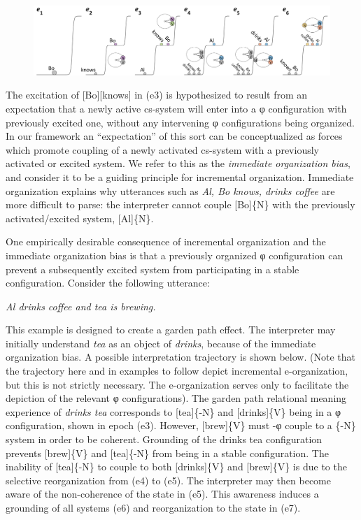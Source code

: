   
\begin{figure}
\includegraphics[width=\textwidth]{figures/Tilsen-img129.png}
\caption{\missingcaption}
\label{fig:}
\end{figure}
 

  The excitation of [Bo][knows] in (e3) is hypothesized to result from an expectation that a newly active cs-system will enter into a φ configuration with previously excited one, without any intervening φ configurations being organized. In our framework an “expectation” of this sort can be conceptualized as forces which promote coupling of a newly activated cs-system with a previously activated or excited system. We refer to this as the \textit{immediate organization bias}, and consider it to be a guiding principle for incremental organization. Immediate organization explains why utterances such as \textit{Al, Bo knows, drinks coffee} are more difficult to parse: the interpreter cannot couple [Bo]\{N\} with the previously activated/excited system, [Al]\{N\}.

  One empirically desirable consequence of incremental organization and the immediate organization bias is that a previously organized φ configuration can prevent a subsequently excited system from participating in a stable configuration. Consider the following utterance: 

    \textit{Al drinks coffee and tea is brewing.}   

  This example is designed to create a garden path effect. The interpreter may initially understand \textit{tea} as an object of \textit{drinks}, because of the immediate organization bias. A possible interpretation trajectory is shown below. (Note that the trajectory here and in examples to follow depict incremental e-organization, but this is not strictly necessary. The e-organization serves only to facilitate the depiction of the relevant φ configurations). The garden path relational meaning experience of \textit{drinks tea} corresponds to [tea]\{-N\} and [drinks]\{V\} being in a φ configuration, shown in epoch (e3).  However, [brew]\{V\} must -φ couple to a \{-N\} system in order to be coherent. Grounding of the {\textbar}drinks tea{\textbar} configuration prevents [brew]\{V\} and [tea]\{-N\} from being in a stable configuration. The inability of [tea]\{-N\} to couple to both [drinks]\{V\} and [brew]\{V\} is due to the selective reorganization from (e4) to (e5). The interpreter may then become aware of the non-coherence of the state in (e5). This awareness induces a grounding of all systems (e6) and reorganization to the state in (e7). 

